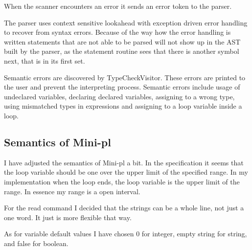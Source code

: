\documentclass[12pt,a4paper]{article}
\begin{document}
When the scanner encounters an error it sends an error token to the parser.

The parser uses context sensitive lookahead with exception driven error
handling to recover from syntax errors. Because of the way how the error
handling is written statements that are not able to be parsed will not show up
in the AST built by the parser, as the statement routine sees that there is
another symbol next, that is in its first set.

Semantic errors are discovered by TypeCheckVisitor.
These errors are printed to the user and prevent the interpreting process.
Semantic errors include usage of undeclared variables, declaring declared variables,
assigning to a wrong type, using mismatched types in expressions and assigning
to a loop variable inside a loop.

\subsection{Semantics of Mini-pl}

I have adjusted the semantics of Mini-pl a bit. In the specification
it seems that the loop variable should be one over the upper limit of the 
specified range. In my implementation when the loop ends, the loop variable
is the upper limit of the range. In essence my range is a open interval.

For the read command I decided that the strings can be a whole line,
not just a one word. It just is more flexible that way.

As for variable default values I have chosen 0 for integer, empty string for string, and 
false for boolean.
\end{document}
